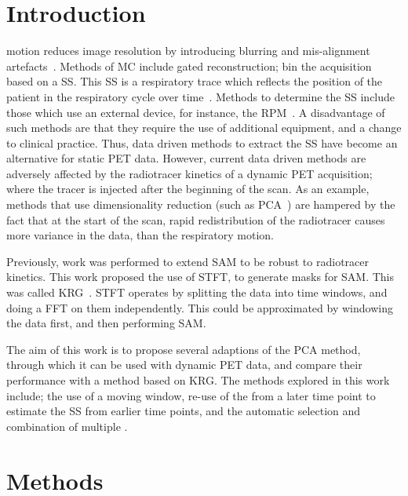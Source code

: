 \section{Introduction} \label{sec:introduction}
     motion reduces image resolution by introducing blurring and mis-alignment artefacts~\cite{Nehmeh2008a}. Methods of \gls{MC} include gated reconstruction; bin the acquisition based on a \gls{SS}. This \gls{SS} is a respiratory trace which reflects the position of the patient in the respiratory cycle over time~\cite{Kesner2010AMethods, Kesner2013GatingPET}. Methods to determine the \gls{SS} include those which use an external device, for instance, the \gls{RPM}~\cite{Bettinardi2013Motion-trackingPET/CT}. A disadvantage of such methods are that they require the use of additional equipment, and a change to clinical practice. Thus, data driven methods to extract the \gls{SS} have become an alternative for static \acrshort{PET} data. However, current data driven methods are adversely affected by the radiotracer kinetics of a dynamic \acrshort{PET} acquisition; where the tracer is injected after the beginning of the scan. As an example, methods that use dimensionality reduction (such as \acrshort{PCA}~\cite{Thielemans2011, Bertolli2018Data-DrivenTomography}) are hampered by the fact that at the start of the scan, rapid redistribution of the radiotracer causes more variance in the data, than the respiratory motion.
    
    Previously, work was performed to extend \gls{SAM} to be robust to radiotracer kinetics. This work proposed the use of \gls{STFT}, to generate masks for \gls{SAM}. This was called \gls{KRG}~\cite{Schleyer2014}. \gls{STFT} operates by splitting the data into time windows, and doing a \acrlong{FFT} on them independently. This could be approximated by windowing the data first, and then performing \gls{SAM}.
    
    The aim of this work is to propose several adaptions of the \acrshort{PCA} method, through which it can be used with dynamic \acrshort{PET} data, and compare their performance with a method based on \gls{KRG}. The methods explored in this work include; the use of a moving window, re-use of the  from a later time point to estimate the \gls{SS} from earlier time points, and the automatic selection and combination of multiple .

    
\section{Methods} \label{sec:methods}
